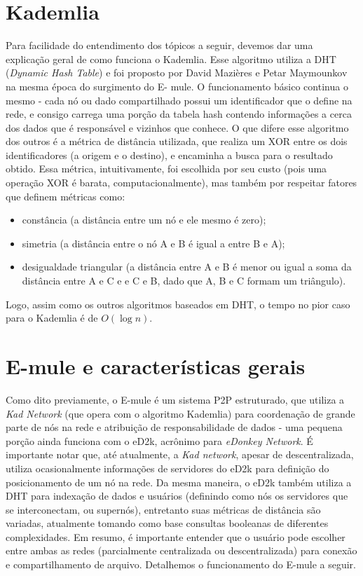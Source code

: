 \documentclass[a4paper]{article}
\begin{document}
\newpage
\section{Kademlia}
	Para facilidade do entendimento dos tópicos a seguir, devemos dar uma explicação geral de como funciona o Kademlia. Esse 
algoritmo utiliza a DHT (\textit{Dynamic Hash Table}) e foi proposto por David Mazières e Petar Maymounkov na mesma época do surgimento do E-
mule. O funcionamento básico continua o mesmo - cada nó ou dado compartilhado possui um identificador que o define na rede, e consigo 
carrega uma porção da tabela hash contendo informações a cerca dos dados que é responsável e vizinhos que conhece. O que difere esse 
algoritmo dos outros é a métrica de distância utilizada, que realiza um XOR entre os dois identificadores (a origem e o destino), e 
encaminha a busca para o resultado obtido. Essa métrica, intuitivamente, foi escolhida por seu custo (pois uma operação XOR é barata, 
computacionalmente), mas também por respeitar fatores que definem métricas como:
	\begin{itemize}
		\item constância (a distância entre um nó e ele mesmo é zero);
		\item simetria (a distância entre o nó A e B é igual a entre B e A);
		\item desigualdade triangular (a distância entre A e B é menor ou igual a soma da distância entre A e C e e C e B, dado que 
A, B e C formam um triângulo).
	\end{itemize} 

		Logo, assim como os outros algoritmos baseados em DHT, o tempo no pior caso para o Kademlia é de $O(\log{}n)$.
	
\section{E-mule e características gerais}
	Como dito previamente, o E-mule é um sistema P2P estruturado, que utiliza a \textit{Kad Network} (que opera com o algoritmo 
Kademlia) para coordenação de grande parte de nós na rede e atribuição de responsabilidade de dados - uma pequena porção ainda funciona 
com o eD2k, acrônimo para \textit{eDonkey Network}. É importante notar que, até atualmente, a \textit{Kad network}, apesar de 
descentralizada, utiliza ocasionalmente informações de servidores do eD2k para definição do posicionamento de um nó na rede. Da mesma 
maneira, o eD2k também utiliza a DHT para indexação de dados e usuários (definindo como nós os servidores que se interconectam, ou 
supernós), entretanto suas métricas de distância são variadas, atualmente tomando como base consultas booleanas de diferentes 
complexidades. Em resumo, é importante entender que o usuário pode escolher entre ambas as redes (parcialmente centralizada ou 
descentralizada) para conexão e compartilhamento de arquivo. Detalhemos o funcionamento do E-mule a seguir.
\end{document}
